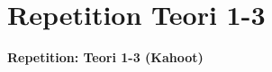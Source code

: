 \section{Repetition Teori 1-3}

\begin{frame}
  \vspace{3em}
  \begin{center}
    {\LARGE \textbf{Repetition: Teori 1-3 (Kahoot)}}
  \end{center}
\end{frame}